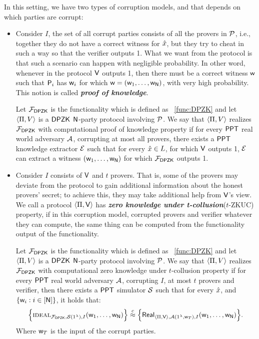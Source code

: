 In this setting, we have two types of corruption models, and that depends on which parties are corrupt:
\begin{itemize} 
	\item Consider $I$, the set of all corrupt parties consists of all the provers in $\mathcal{P}$, i.e., together they do not have a correct witness for $\hat{x}$, but they try to cheat in such a way so that the verifier outputs 1. What we want from the protocol is that such a scenario can happen with negligible probability. In other word, whenever in the protocol $\mathsf{V}$ outputs 1, then there must be a correct witness $\mathsf{w}$ such that $\mathsf{P}_i$ has $\mathsf{w}_i$ for which $\mathsf{w} = (\mathsf{w}_1, \ldots, \mathsf{w}_{\mathsf{N}})$, with very high probability. This notion is called \textbf{\textit{proof of knowledge}}. 
	\begin{definition}
		Let $\mathcal{F}_{\mathsf{DPZK}}$ is the functionality which is defined as ~\ref{func:DPZK} and let $\langle \Pi,V\rangle$ is a $\mathsf{DPZK}$ $\mathsf{N}$-party protocol involving $\mathcal{P}$. We say that $\langle \Pi,V\rangle$ realizes $\mathcal{F}_{\mathsf{DPZK}}$ with computational proof of knowledge property if for every $\mathsf{PPT}$ real world adversary $\mathcal{A}$, corrupting at most all provers, there exists a $\mathsf{PPT}$ knowledge extractor $\mathcal{E}$ such that for every $\hat{x} \in L$, for which $\mathsf{V}$ outputs 1, $\mathcal{E}$ can extract a witness $(\mathsf{w}_1, \ldots, \mathsf{w}_{\mathsf{N}})$ for which $\mathcal{F}_{\mathsf{DPZK}}$ outputs 1.
	\end{definition}    
	
	\item Consider $I$ consists of $\mathsf{V}$ and $t$ provers. That is, some of the provers may deviate from the protocol to gain additional information about the honest provers' secret; to achieve this, they may take additional help from $\mathsf{V}$'s view. We call a protocol $\langle \Pi,\mathsf{V}\rangle$ has \textbf{\textit{zero knowledge under t-collusion}}($t$-ZKUC) property, if in this corruption model, corrupted provers and verifier whatever they can compute, the same thing can be computed from the functionality output of the functionality. 
	\begin{definition}
		Let $\mathcal{F}_{\mathsf{DPZK}}$ is the functionality which is defined as ~\ref{func:DPZK} and let $\langle \Pi,V\rangle$ is a $\mathsf{DPZK}$ $\mathsf{N}$-party protocol involving $\mathcal{P}$. We say that $\langle \Pi,V\rangle$ realizes $\mathcal{F}_{\mathsf{DPZK}}$ with computational zero knowledge under $t$-collusion property if for every $\mathsf{PPT}$ real world adversary $\mathcal{A}$, corrupting $I$, at most $t$ provers and verifier, then there exists a $\mathsf{PPT}$ simulator $\mathcal{S}$ such that for every $\hat{x}$, and $\{\mathsf{w}_i : i\in [\mathsf{N}]\}$, it holds that: 
		$$\Big\{\textsc{ideal}_{\mathcal{F}_{\mathsf{DPZK}}, \mathcal{S}(1^{\lambda}),I}(\mathsf{w}_1, \ldots, \mathsf{w}_{\mathsf{N}}) \Big\} \stackrel{c}{\approx} \Big\{ \mathsf{Real}_{\langle \Pi,\mathsf{V}\rangle, \mathcal{A}(1^{\lambda}, \mathsf{w}_T),I}(\mathsf{w}_1, \ldots, \mathsf{w}_{\mathsf{N}}) \Big\}. $$
		Where $\mathsf{w}_T$ is the input of the corrupt parties.
	\end{definition}
\end{itemize}

